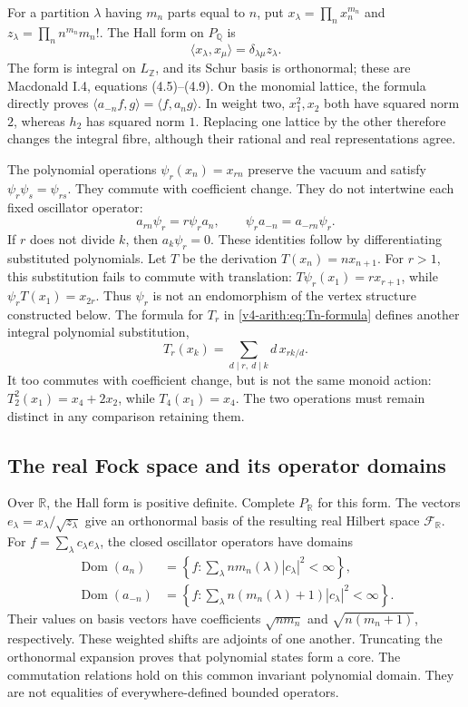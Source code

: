 For a partition $\lambda$ having $m_n$ parts equal to $n$, put
$x_\lambda=\prod_nx_n^{m_n}$ and
$z_\lambda=\prod_n n^{m_n}m_n!$. The Hall form on $P_{\mathbb Q}$ is
\[
 \langle x_\lambda,x_\mu\rangle
 =\delta_{\lambda\mu}z_\lambda.
\]
The form is integral on $L_{\mathbb Z}$, and its Schur basis is
orthonormal; these are Macdonald I.4, equations (4.5)--(4.9).
On the monomial lattice, the formula directly proves
$\langle a_{-n}f,g\rangle=\langle f,a_ng\rangle$.
In weight two, $x_1^2,x_2$ both have squared norm $2$, whereas
$h_2$ has squared norm $1$. Replacing one lattice by the other
therefore changes the integral fibre, although their rational and real
representations agree.

The polynomial operations $\psi_r(x_n)=x_{rn}$ preserve the vacuum
and satisfy $\psi_r\psi_s=\psi_{rs}$. They commute with coefficient
change. They do not intertwine each fixed oscillator operator:
\[
 a_{rn}\psi_r=r\psi_ra_n,\qquad
 \psi_ra_{-n}=a_{-rn}\psi_r.
\]
If $r$ does not divide $k$, then $a_k\psi_r=0$.
These identities follow by differentiating substituted polynomials.
Let $T$ be the derivation $T(x_n)=nx_{n+1}$.
For $r>1$, this substitution fails to commute with translation:
$T\psi_r(x_1)=rx_{r+1}$, while $\psi_rT(x_1)=x_{2r}$.
Thus $\psi_r$ is not an endomorphism of the vertex structure constructed below.
The formula for $T_r$ in \eqref{v4-arith:eq:Tn-formula} defines another
integral polynomial substitution,
\[
 T_r(x_k)=\sum_{d\mid r,\ d\mid k}d\,x_{rk/d}.
\]
It too commutes with coefficient change, but is not the same monoid action:
$T_2^2(x_1)=x_4+2x_2$, while $T_4(x_1)=x_4$.
The two operations must remain distinct in any comparison retaining them.

\subsection{The real Fock space and its operator domains}

Over $\mathbb R$, the Hall form is positive definite. Complete
$P_{\mathbb R}$ for this form. The vectors
$e_\lambda=x_\lambda/\sqrt{z_\lambda}$ give an orthonormal basis of
the resulting real Hilbert space $\mathcal F_{\mathbb R}$.
For $f=\sum_\lambda c_\lambda e_\lambda$, the closed oscillator operators
have domains
\[
 \begin{aligned}
 \operatorname{Dom}(a_n)
 &=\left\{f:\sum_\lambda n m_n(\lambda)|c_\lambda|^2<\infty\right\},\\
 \operatorname{Dom}(a_{-n})
 &=\left\{f:\sum_\lambda n(m_n(\lambda)+1)|c_\lambda|^2<\infty\right\}.
 \end{aligned}
\]
Their values on basis vectors have coefficients
$\sqrt{n m_n}$ and $\sqrt{n(m_n+1)}$, respectively.
These weighted shifts are adjoints of one another. Truncating the
orthonormal expansion proves that polynomial states form a core.
The commutation relations hold on this common invariant polynomial domain.
They are not equalities of everywhere-defined bounded operators.

